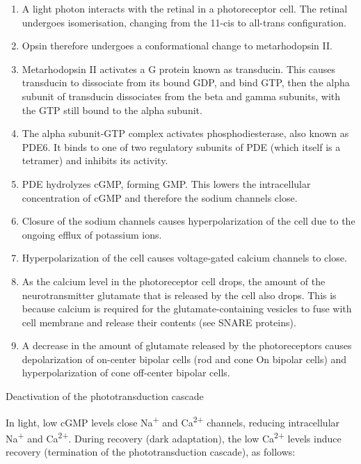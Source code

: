 \documentclass[]{book}
\providecommand{\tightlist}{%
  \setlength{\itemsep}{0pt}\setlength{\parskip}{0pt}}
\begin{document}
\begin{enumerate}
\def\labelenumi{\arabic{enumi}.}
\tightlist
\item
  A light photon interacts with the retinal in a photoreceptor cell. The retinal undergoes isomerisation, changing from the 11-cis to all-trans configuration.
\item
  Opsin therefore undergoes a conformational change to metarhodopsin II.
\item
  Metarhodopsin II activates a G protein known as transducin. This causes transducin to dissociate from its bound GDP, and bind GTP, then the alpha subunit of transducin dissociates from the beta and gamma subunits, with the GTP still bound to the alpha subunit.
\item
  The alpha subunit-GTP complex activates phosphodiesterase, also known as PDE6. It binds to one of two regulatory subunits of PDE (which itself is a tetramer) and inhibits its activity.
\item
  PDE hydrolyzes cGMP, forming GMP. This lowers the intracellular concentration of cGMP and therefore the sodium channels close.
\item
  Closure of the sodium channels causes hyperpolarization of the cell due to the ongoing efflux of potassium ions.
\item
  Hyperpolarization of the cell causes voltage-gated calcium channels to close.
\item
  As the calcium level in the photoreceptor cell drops, the amount of the neurotransmitter glutamate that is released by the cell also drops. This is because calcium is required for the glutamate-containing vesicles to fuse with cell membrane and release their contents (see SNARE proteins).
\item
  A decrease in the amount of glutamate released by the photoreceptors causes depolarization of on-center bipolar cells (rod and cone On bipolar cells) and hyperpolarization of cone off-center bipolar cells.
\end{enumerate}

Deactivation of the phototransduction cascade

In light, low cGMP levels close Na\textsuperscript{+} and Ca\textsuperscript{2+} channels, reducing intracellular Na\textsuperscript{+} and Ca\textsuperscript{2+}. During recovery (dark adaptation), the low Ca\textsuperscript{2+} levels induce recovery (termination of the phototransduction cascade), as follows:
\end{document}
